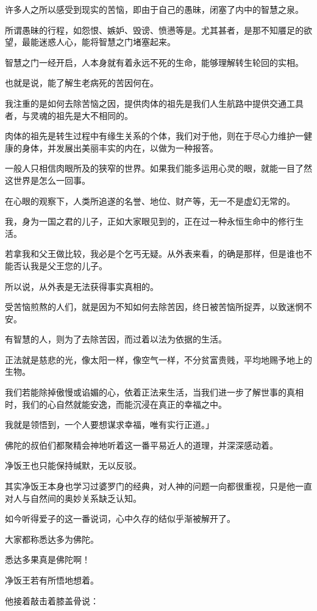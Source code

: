 \documentclass[twoside,openany]{book}
\begin{document}
许多人之所以感受到现实的苦恼，即由于自己的愚昧，闭塞了内中的智慧之泉。

所谓愚昧的行程，如怨恨、嫉妒、毁谤、愤懑等是。尤其甚者，是那不知餍足的欲望，最能迷惑人心，能将智慧之门堵塞起来。

智慧之门一经开启，人本身就有着永远不死的生命，能够理解转生轮回的实相。

也就是说，能了解生老病死的苦因何在。

我注重的是如何去除苦恼之因，提供肉体的祖先是我们人生航路中提供交通工具者，与灵魂的祖先是大不相同的。

肉体的祖先是转生过程中有缘生关系的个体，我们对于他，则在于尽心力维护一健康的身体，并发展出美丽丰实的内在，以做为一种报答。

一般人只相信肉眼所及的狭窄的世界。如果我们能多运用心灵的眼，就能一目了然这世界是怎么一回事。

在心眼的观察下，人类所追遂的名誉、地位、财产等，无一不是虚幻无常的。

我，身为一国之君的儿子，正如大家眼见到的，正在过一种永恒生命中的修行生活。

若拿我和父王做比较，我必是个乞丐无疑。从外表来看，的确是那样，但是谁也不能否认我是父王您的儿子。

所以说，从外表是无法获得事实真相的。

受苦恼煎熬的人们，就是因为不知如何去除苦因，终日被苦恼所捉弄，以致迷惘不安。

有智慧的人，则为了去除苦因，而过着以法为依据的生活。

正法就是慈悲的光，像太阳一样，像空气一样，不分贫富贵贱，平均地赐予地上的生物。

我们若能除掉傲慢或谄媚的心，依着正法来生活，当我们进一步了解世事的真相时，我们的心自然就能安逸，而能沉浸在真正的幸福之中。

我就是领悟到，一个人要想谋求幸福，唯有实行正道。」

佛陀的叔伯们都聚精会神地听着这一番平易近人的道理，并深深感动着。

净饭王也只能保持缄默，无以反驳。

其实净饭王本身也学习过婆罗门的经典，对人神的问题一向都很重视，只是他一直对人与自然间的奥妙关系缺乏认知。

如今听得爱子的这一番说词，心中久存的结似乎渐被解开了。

大家都称悉达多为佛陀。

悉达多果真是佛陀啊！

净饭王若有所悟地想着。

他接着敲击着膝盖骨说：
\end{document}
